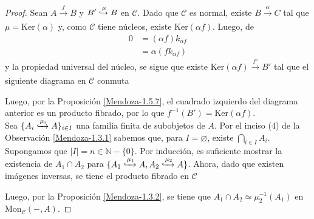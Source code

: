 \documentclass[tesis]{subfiles}
\begin{document}
\begin{proof}
    Sean $A\xrightarrow[]{f}B$ y $B'\xhookrightarrow{\mu}B$ en $\mathscr{C}$. Dado que $\mathscr{C}$ es normal, existe $B\xrightarrow[]{\alpha}C$ tal que $\mu=\text{Ker}(\alpha)$ y, como $\mathscr{C}$ tiene núcleos, existe $\text{Ker}(\alpha f)$. Luego, de
    \begin{align*}
        0 &= (\alpha f)k_{\alpha f} \\
          &= \alpha(fk_{\alpha f})
    \end{align*}
    y la propiedad universal del núcleo, se sigue que existe $\text{Ker}(\alpha f)\xrightarrow[]{f'} B'$ tal que el siguiente diagrama en $\mathscr{C}$ conmuta
    \begin{center}
    \end{center}
    Luego, por la Proposición \ref{Mendoza-1.5.7}, el cuadrado izquierdo del diagrama anterior es un producto fibrado, por lo que $f^{-1}(B') = \text{Ker}(\alpha f)$. \\

    Sea $\{A_i\xhookrightarrow[]{\mu_i} A\}_{i\in I}$ una familia finita de subobjetos de $A$. Por el inciso (4) de la Observación \ref{Mendoza-1.3.1} sabemos que, para $I=\varnothing$, existe $\bigcap_{i\in I}A_i$. Supongamos que $|I|=n\in\mathbb{N}-\{0\}$. Por inducción, es suficiente mostrar la existencia de $A_1\cap A_2$ para $\{A_1\xhookrightarrow[]{\mu_1}A, A_2\xhookrightarrow{\mu_2}A\}$. Ahora, dado que existen imágenes inversas, se tiene el producto fibrado en $\mathscr{C}$
    \begin{center}
    \end{center}
    Luego, por la Proposición \ref{Mendoza-1.3.2}, se tiene que $A_1\cap A_2 \simeq \mu_2^{-1}(A_1)$ en $\text{Mon}_\mathscr{C}(-,A)$.
\end{proof}
\end{document}
